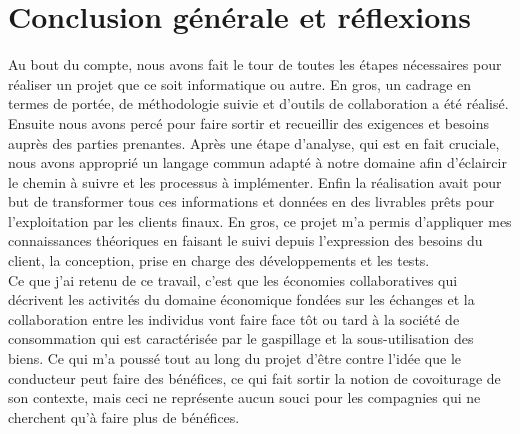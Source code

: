 \chapter{Conclusion générale et réflexions}
\label{Conclusion}
Au bout du compte, nous avons fait le tour de toutes les étapes nécessaires pour réaliser un projet que ce soit informatique ou autre.\newline
En gros, un cadrage en termes de portée, de méthodologie suivie et d'outils de collaboration a été réalisé.\newline
Ensuite nous avons percé pour faire sortir et recueillir des exigences et besoins auprès des parties prenantes.\newline 
Après une étape d'analyse, qui est en fait cruciale, nous avons approprié un langage commun adapté à notre domaine afin d’éclaircir le chemin à suivre et les processus à implémenter.\newline
Enfin la réalisation avait pour but de transformer tous ces informations et données en des livrables prêts pour l'exploitation par les clients finaux.\newline
En gros, ce projet m'a permis d'appliquer mes connaissances théoriques en faisant le suivi depuis l'expression des besoins du client, la conception, prise en charge des développements et les tests.\\[1in]
Ce que j'ai retenu de ce travail, c'est que les économies collaboratives qui décrivent les activités du domaine économique fondées sur les échanges et la collaboration entre les individus vont faire face tôt ou tard à la société de consommation qui est caractérisée par le gaspillage et la sous-utilisation des biens. Ce qui m'a poussé tout au long du projet d'être contre l'idée que le conducteur peut faire des bénéfices, ce qui fait sortir la notion de covoiturage de son contexte, mais ceci ne représente aucun souci pour les compagnies qui ne cherchent qu'à faire plus de bénéfices.
